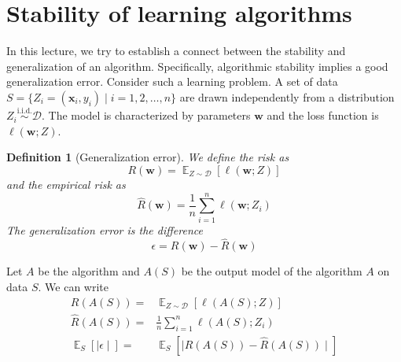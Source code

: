 \documentclass[12pt]{report}
\def \bs{\boldsymbol}
\def \iid{\text{i.i.d.}}
\DeclareMathOperator*{\E}{\mathbb E}
\newcommand{\abs}[1]{\mid #1 \mid}
\newcommand{\set}[1]{\{#1\}}
\newcommand{\D}{\mathcal{D}}
\newtheorem{defn}[lemma]{Definition}
\begin{document}

\maketitle

\vspace*{.1in}



\section{Stability of learning algorithms}
In this lecture, we try to establish a connect between the stability and generalization of an algorithm. Specifically, algorithmic stability implies a good generalization error. Consider such a learning problem. A set of data $S = \set{Z_i = (\bs{x}_i, y_i) \mid i = 1,2,\ldots, n}$ are drawn independently from a distribution $Z_i \overset{\iid}{\sim}\D$. The model is characterized by parameters $\bs{w}$ and the loss function is $\ell(\bs{w};Z)$. 

\begin{defn}[Generalization error]
We define the risk as 
\begin{equation} \label{scr:risk}
	R(\bs{w}) = \E_{Z \sim \D}[\ell(\bs{w}; Z)]
\end{equation} 
and the empirical risk as
\begin{equation} \label{scr:emp-risk}
	\hat{R}(\bs{w}) = \frac{1}{n} \sum_{i=1}^{n} \ell(\bs{w};Z_i)
\end{equation}
The generalization error is the difference 
\begin{equation} \label{scr:generr}
	\epsilon = R(\bs{w}) - \hat{R}(\bs{w})
\end{equation}
\end{defn}

Let $A$ be the algorithm and $A(S)$ be the output model of the algorithm $A$ on data $S$. We can write
\begin{align*}
	R(A(S)) =& \E_{Z \sim \D}[\ell(A(S);Z)] \\
	\hat{R}(A(S)) =& \frac{1}{n} \sum_{i=1}^{n} \ell(A(S);Z_i) \\
	\E_S[\abs{\epsilon}] =& \E_S[\abs{R(A(S)) - \hat{R}(A(S))}]
\end{align*}
\end{document}
